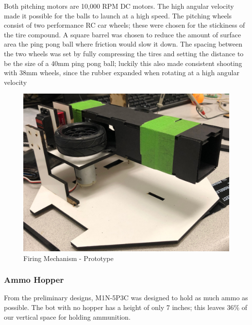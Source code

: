 \documentclass{article}
\begin{document}
Both pitching motors are 10,000 RPM DC motors. The high angular velocity made it possible for the balls to launch at a high speed. The pitching wheels consist of two performance RC car wheels; these were chosen for the stickiness of the tire compound. A square barrel was chosen to reduce the amount of surface area the ping pong ball where friction would slow it down. The spacing between the two wheels was set by fully compressing the tires  and setting the distance to be the size of a 40mm ping pong ball; luckily this also made consistent shooting with 38mm wheels, since the rubber expanded when rotating at a high angular velocity

\begin{figure}[H]
    \centering
    \includegraphics[width = 5in]{FiringMechanismProto.JPG}
    \caption{Firing Mechanism - Prototype}
    \label{fig:FiringMechanismProto}
\end{figure}


\subsubsection{Ammo Hopper}

From the preliminary designs, M1N-5P3C was designed to hold as much ammo as possible. The bot  with no hopper has a height of only 7 inches; this leaves 36\% of our vertical space for holding ammunition.
\end{document}
